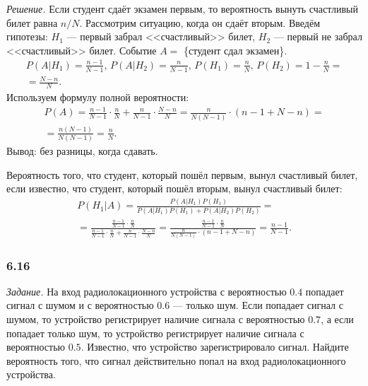 \textit{Решение.} Если студент сдаёт экзамен первым, то вероятность вынуть счастливый билет равна $n/N$.
Рассмотрим ситуацию, когда он сдаёт вторым.
Введём гипотезы: $H_1$ --- первый забрал <<счастливый>> билет, $H_2$ --- первый не забрал <<счастливый>> билет.
Событие $A =$ \{студент сдал экзамен\}.
\begin{equation*}
\begin{split}
P \left( \left. A \right| H_1 \right) =
\frac{n-1}{N-1}, \,
P \left( \left. A \right| H_2 \right) =
\frac{n}{N-1}, \,
P \left( H_1 \right) =
\frac{n}{N}, \,
P \left( H_2 \right) =
1 - \frac{n}{N} = \\
= \frac{N-n}{N}.
\end{split}
\end{equation*}
Используем формулу полной вероятности:
\begin{equation*}
\begin{split}
P \left( A \right) =
\frac{n-1}{N-1} \cdot \frac{n}{N} + \frac{n}{N-1} \cdot \frac{N-n}{N} =
\frac{n}{N \left( N-1 \right) } \cdot \left( n-1+N-n \right) = \\
= \frac{n \left( N-1 \right) }{N \left( N-1 \right) } =
\frac{n}{N}.
\end{split}
\end{equation*}
Вывод: без разницы, когда сдавать.

Вероятность того, что студент, который пошёл первым, вынул счастливый билет, если известно, что студент, который пошёл вторым, вынул счастливый билет:
\begin{equation*}
\begin{split}
P \left( \left. H_1 \right| A \right) =
\frac{P \left( \left. A \right| H_1 \right) P \left( H_1 \right) }{P \left( \left. A \right| H_1 \right) P \left( H_1 \right) +
P \left( \left. A \right| H_2 \right) P \left( H_2 \right) } = \\
= \frac{ \frac{n-1}{N-1} \cdot \frac{n}{N} }{ \frac{n-1}{N-1} \cdot \frac{n}{N} + \frac{n}{N-1} \cdot \frac{N-n}{N} } =
\frac{ \frac{n-1}{N-1} \cdot \frac{n}{N} }{ \frac{n}{N \left( N-1 \right) } \cdot \left( n-1+N-n \right) } =
\frac{n-1}{N-1}.
\end{split}
\end{equation*}

\subsubsection*{6.16}

\textit{Задание.} На вход радиолокационного устройства с вероятностью $0.4$ попадает сигнал с шумом и с вероятностью $0.6$ --- только шум.
Если попадает сигнал с шумом, то устройство регистрирует наличие сигнала с вероятностью $0.7$, а если попадает только шум,
то устройство регистрирует наличие сигнала с вероятностью $0.5$.
Известно, что устройство зарегистрировало сигнал.
Найдите вероятность того, что сигнал действительно попал на вход радиолокационного устройства.


